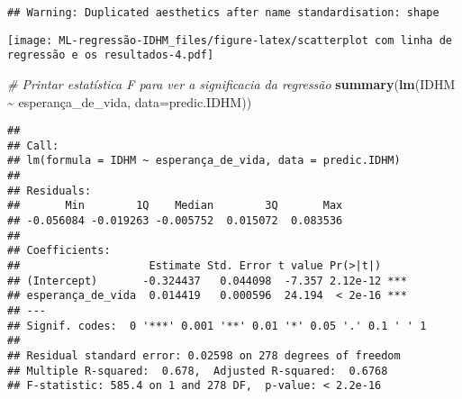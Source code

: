 \documentclass[
]{article}
\newenvironment{Shaded}{\begin{snugshade}}{\end{snugshade}}
\newcommand{\AttributeTok}[1]{\textcolor[rgb]{0.13,0.29,0.53}{#1}}
\newcommand{\CommentTok}[1]{\textcolor[rgb]{0.56,0.35,0.01}{\textit{#1}}}
\newcommand{\FunctionTok}[1]{\textcolor[rgb]{0.13,0.29,0.53}{\textbf{#1}}}
\newcommand{\NormalTok}[1]{#1}
\newcommand{\SpecialCharTok}[1]{\textcolor[rgb]{0.81,0.36,0.00}{\textbf{#1}}}
\begin{document}
\begin{verbatim}
## Warning: Duplicated aesthetics after name standardisation: shape
\end{verbatim}

\texttt{[image: ML-regressão-IDHM\_files/figure-latex/scatterplot com linha de regressão e os resultados-4.pdf]}

\begin{Shaded}
\begin{Highlighting}[]
\CommentTok{\# Printar estatística F para ver a significacia da regressão}
\FunctionTok{summary}\NormalTok{(}\FunctionTok{lm}\NormalTok{(IDHM }\SpecialCharTok{\textasciitilde{}}\NormalTok{ esperança\_de\_vida, }\AttributeTok{data=}\NormalTok{predic.IDHM))}
\end{Highlighting}
\end{Shaded}

\begin{verbatim}
## 
## Call:
## lm(formula = IDHM ~ esperança_de_vida, data = predic.IDHM)
## 
## Residuals:
##       Min        1Q    Median        3Q       Max 
## -0.056084 -0.019263 -0.005752  0.015072  0.083536 
## 
## Coefficients:
##                    Estimate Std. Error t value Pr(>|t|)    
## (Intercept)       -0.324437   0.044098  -7.357 2.12e-12 ***
## esperança_de_vida  0.014419   0.000596  24.194  < 2e-16 ***
## ---
## Signif. codes:  0 '***' 0.001 '**' 0.01 '*' 0.05 '.' 0.1 ' ' 1
## 
## Residual standard error: 0.02598 on 278 degrees of freedom
## Multiple R-squared:  0.678,  Adjusted R-squared:  0.6768 
## F-statistic: 585.4 on 1 and 278 DF,  p-value: < 2.2e-16
\end{verbatim}
\end{document}
